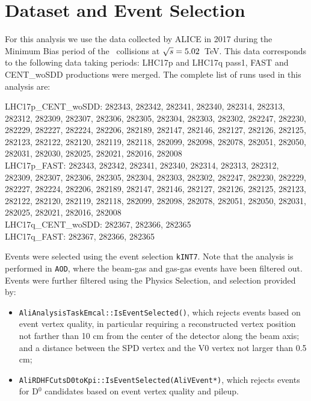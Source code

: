 \section{Dataset and Event Selection}

For this analysis we use the data collected by ALICE in 2017 during the Minimum Bias period of the \pp\ collisions at $\sqrt{s}=5.02$~TeV. This data corresponds to the following data taking periods:
LHC17p and LHC17q pass1, FAST and CENT\_woSDD productions were merged.
The complete list of runs used in this analysis are:

LHC17p\_CENT\_woSDD: 282343, 282342, 282341, 282340, 282314, 282313, 282312, 282309, 282307, 282306, 282305, 282304, 282303, 282302, 282247, 282230, 282229, 282227, 282224, 282206, 282189, 282147, 282146, 282127, 282126, 282125, 282123, 282122, 282120, 282119, 282118, 282099, 282098, 282078, 282051, 282050, 282031, 282030, 282025, 282021, 282016, 282008 \\
LHC17p\_FAST: 282343, 282342, 282341, 282340, 282314, 282313, 282312, 282309, 282307, 282306, 282305, 282304, 282303, 282302, 282247, 282230, 282229, 282227, 282224, 282206, 282189, 282147, 282146, 282127, 282126, 282125, 282123, 282122, 282120, 282119, 282118, 282099, 282098, 282078, 282051, 282050, 282031, 282025, 282021, 282016, 282008 \\
LHC17q\_CENT\_woSDD: 282367, 282366, 282365 \\
LHC17q\_FAST: 282367, 282366, 282365

Events were selected using the event selection \texttt{kINT7}. Note that the analysis is performed in \texttt{AOD}, where the beam-gas and gas-gas events have been filtered out.
Events were further filtered using the Physics Selection, and selection provided by:
\begin{itemize}
\item \texttt{AliAnalysisTaskEmcal::IsEventSelected()}, which rejects events based on event vertex quality, in particular requiring a reconstructed vertex position not farther than 10 cm from the center of the detector along the beam axis; and a distance between the SPD vertex and the V0 vertex not larger than 0.5 cm;
\item \texttt{AliRDHFCutsD0toKpi::IsEventSelected(AliVEvent*)}, which rejects events for D$^0$ candidates based on event vertex quality and pileup.
\end{itemize}

